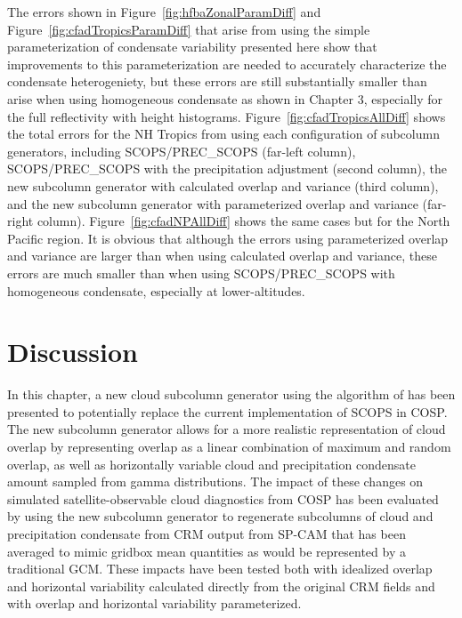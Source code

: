 The errors shown in Figure~\ref{fig:hfbaZonalParamDiff} and
Figure~\ref{fig:cfadTropicsParamDiff} that arise from using the simple
parameterization of condensate variability presented here show that
improvements to this parameterization are needed to accurately
characterize the condensate heterogeniety, but these errors are still
substantially smaller than arise when using homogeneous condensate as
shown in Chapter 3, especially for the full reflectivity with height
histograms. Figure~\ref{fig:cfadTropicsAllDiff} shows the total errors
for the NH Tropics from using each configuration of subcolumn
generators, including SCOPS/PREC\_SCOPS (far-left column),
SCOPS/PREC\_SCOPS with the precipitation adjustment (second column), the
new subcolumn generator with calculated overlap and variance (third
column), and the new subcolumn generator with parameterized overlap and
variance (far-right column). Figure~\ref{fig:cfadNPAllDiff} shows the
same cases but for the North Pacific region. It is obvious that although
the errors using parameterized overlap and variance are larger than when
using calculated overlap and variance, these errors are much smaller
than when using SCOPS/PREC\_SCOPS with homogeneous condensate,
especially at lower-altitudes.

\section{Discussion}\label{sec:subgrid2Discussion}

In this chapter, a new cloud subcolumn generator using the algorithm of
\citet{raisanen_et_al_2004} has been presented to potentially replace
the current implementation of SCOPS in COSP. The new subcolumn generator
allows for a more realistic representation of cloud overlap by
representing overlap as a linear combination of maximum and random
overlap, as well as horizontally variable cloud and precipitation
condensate amount sampled from gamma distributions. The impact of these
changes on simulated satellite-observable cloud diagnostics from COSP
has been evaluated by using the new subcolumn generator to regenerate
subcolumns of cloud and precipitation condensate from CRM output from
SP-CAM that has been averaged to mimic gridbox mean quantities as would
be represented by a traditional GCM. These impacts have been tested both
with idealized overlap and horizontal variability calculated directly
from the original CRM fields and with overlap and horizontal variability
parameterized.

